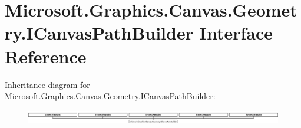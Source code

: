\hypertarget{interface_microsoft_1_1_graphics_1_1_canvas_1_1_geometry_1_1_i_canvas_path_builder}{}\section{Microsoft.\+Graphics.\+Canvas.\+Geometry.\+I\+Canvas\+Path\+Builder Interface Reference}
\label{interface_microsoft_1_1_graphics_1_1_canvas_1_1_geometry_1_1_i_canvas_path_builder}
Inheritance diagram for Microsoft.\+Graphics.\+Canvas.\+Geometry.\+I\+Canvas\+Path\+Builder\+:\begin{figure}[H]
\begin{center}
\leavevmode
\includegraphics[height=0.643678cm]{interface_microsoft_1_1_graphics_1_1_canvas_1_1_geometry_1_1_i_canvas_path_builder}
\end{center}
\end{figure}
